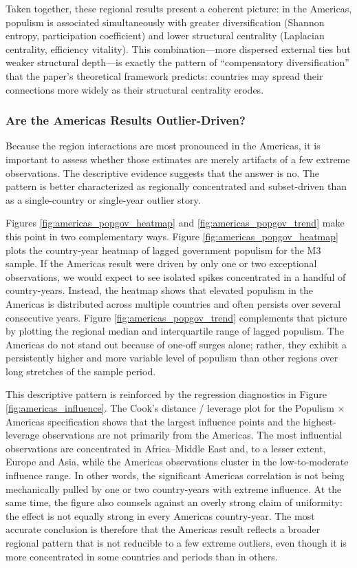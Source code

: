 \documentclass[12pt]{article}
\begin{document}
Taken together, these regional results present a coherent picture: in the Americas, populism is associated simultaneously with greater diversification (Shannon entropy, participation coefficient) and lower structural centrality (Laplacian centrality, efficiency vitality). This combination---more dispersed external ties but weaker structural depth---is exactly the pattern of ``compensatory diversification'' that the paper's theoretical framework predicts: countries may spread their connections more widely as their structural centrality erodes.



\subsubsection*{Are the Americas Results Outlier-Driven?}

Because the region interactions are most pronounced in the Americas, it is important to assess whether those estimates are merely artifacts of a few extreme observations. The descriptive evidence suggests that the answer is no. The pattern is better characterized as regionally concentrated and subset-driven than as a single-country or single-year outlier story.

Figures \ref{fig:americas_popgov_heatmap} and \ref{fig:americas_popgov_trend} make this point in two complementary ways. Figure \ref{fig:americas_popgov_heatmap} plots the country-year heatmap of lagged government populism for the M3 sample. If the Americas result were driven by only one or two exceptional observations, we would expect to see isolated spikes concentrated in a handful of country-years. Instead, the heatmap shows that elevated populism in the Americas is distributed across multiple countries and often persists over several consecutive years. Figure \ref{fig:americas_popgov_trend} complements that picture by plotting the regional median and interquartile range of lagged populism. The Americas do not stand out because of one-off surges alone; rather, they exhibit a persistently higher and more variable level of populism than other regions over long stretches of the sample period.

This descriptive pattern is reinforced by the regression diagnostics in Figure \ref{fig:americas_influence}. The Cook's distance / leverage plot for the Populism $\times$ Americas specification shows that the largest influence points and the highest-leverage observations are not primarily from the Americas. The most influential observations are concentrated in Africa--Middle East and, to a lesser extent, Europe and Asia, while the Americas observations cluster in the low-to-moderate influence range. In other words, the significant Americas correlation is not being mechanically pulled by one or two country-years with extreme influence. At the same time, the figure also counsels against an overly strong claim of uniformity: the effect is not equally strong in every Americas country-year. The most accurate conclusion is therefore that the Americas result reflects a broader regional pattern that is not reducible to a few extreme outliers, even though it is more concentrated in some countries and periods than in others.
\end{document}
